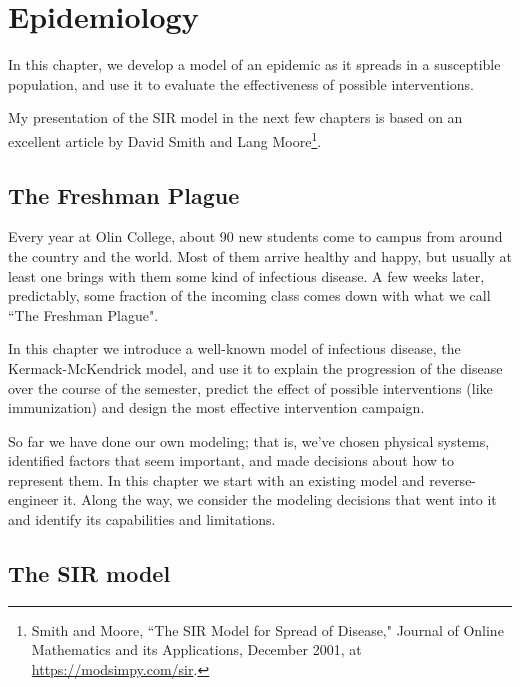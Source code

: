 \documentclass[12pt]{book}
\theoremstyle{exercise}
\begin{document}
\chapter{Epidemiology}
\label{chap11}

In this chapter, we develop a model of an epidemic as it spreads in a susceptible population, and use it to evaluate the effectiveness of possible interventions.


My presentation of the SIR model in the next few chapters is based on an excellent article by David Smith and Lang Moore\footnote{Smith and Moore, ``The SIR Model for Spread of Disease," Journal of Online Mathematics and its Applications, December 2001, at \url{https://modsimpy.com/sir}.}.



\section{The Freshman Plague}

Every year at Olin College, about 90 new students come to campus from around the country and the world.  Most of them arrive healthy and happy, but usually at least one brings with them some kind of infectious disease.  A few weeks later, predictably, some fraction of the incoming class comes down with what we call ``The Freshman Plague".


In this chapter we introduce a well-known model of infectious disease, the Kermack-McKendrick model, and use it to explain the progression of the disease over the course of the semester, predict the effect of possible interventions (like immunization) and design the most effective intervention campaign.


So far we have done our own modeling; that is, we've chosen physical systems, identified factors that seem important, and made decisions about how to represent them.  In this chapter we start with an existing model and reverse-engineer it.  Along the way, we consider the modeling decisions that went into it and identify its capabilities and limitations.


\section{The SIR model}
\end{document}

